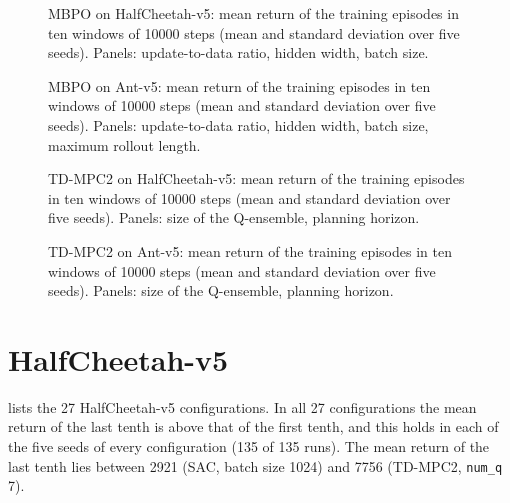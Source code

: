 \begin{figure}[tbp]
  \centering
  
  \caption{MBPO on HalfCheetah-v5: mean return of the training episodes in ten windows of \num{10000} steps (mean and standard deviation over five seeds). Panels: update-to-data ratio, hidden width, batch size.}
  \label{fig:app-return-mbpo-hc}
\end{figure}

\begin{figure}[tbp]
  \centering
  
  \caption{MBPO on Ant-v5: mean return of the training episodes in ten windows of \num{10000} steps (mean and standard deviation over five seeds). Panels: update-to-data ratio, hidden width, batch size, maximum rollout length.}
  \label{fig:app-return-mbpo-ant}
\end{figure}

\begin{figure}[tbp]
  \centering
  
  \caption{TD-MPC2 on HalfCheetah-v5: mean return of the training episodes in ten windows of \num{10000} steps (mean and standard deviation over five seeds). Panels: size of the Q-ensemble, planning horizon.}
  \label{fig:app-return-tdmpc2-hc}
\end{figure}

\begin{figure}[tbp]
  \centering
  
  \caption{TD-MPC2 on Ant-v5: mean return of the training episodes in ten windows of \num{10000} steps (mean and standard deviation over five seeds). Panels: size of the Q-ensemble, planning horizon.}
  \label{fig:app-return-tdmpc2-ant}
\end{figure}

\section{HalfCheetah-v5}\label{sec:app-learn-hc}

 lists the \num{27} HalfCheetah-v5 configurations.
In all \num{27} configurations the mean return of the last tenth is above that of the first tenth, and this holds in each of the five seeds of every configuration (\num{135} of \num{135} runs).
The mean return of the last tenth lies between \num{2921} (SAC, batch size \num{1024}) and \num{7756} (TD-MPC2, \texttt{num\_\allowbreak q} \num{7}).

